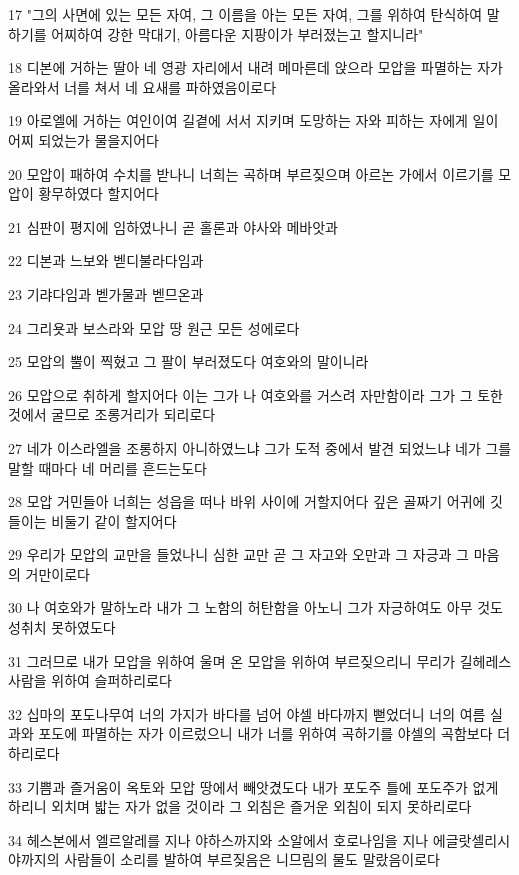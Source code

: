 \par 17 "그의 사면에 있는 모든 자여, 그 이름을 아는 모든 자여, 그를 위하여 탄식하여 말하기를 어찌하여 강한 막대기, 아름다운 지팡이가 부러졌는고 할지니라"
\par 18 디본에 거하는 딸아 네 영광 자리에서 내려 메마른데 앉으라 모압을 파멸하는 자가 올라와서 너를 쳐서 네 요새를 파하였음이로다
\par 19 아로엘에 거하는 여인이여 길곁에 서서 지키며 도망하는 자와 피하는 자에게 일이 어찌 되었는가 물을지어다
\par 20 모압이 패하여 수치를 받나니 너희는 곡하며 부르짖으며 아르논 가에서 이르기를 모압이 황무하였다 할지어다
\par 21 심판이 평지에 임하였나니 곧 홀론과 야사와 메바앗과
\par 22 디본과 느보와 벧디불라다임과
\par 23 기랴다임과 벧가물과 벧므온과
\par 24 그리욧과 보스라와 모압 땅 원근 모든 성에로다
\par 25 모압의 뿔이 찍혔고 그 팔이 부러졌도다 여호와의 말이니라
\par 26 모압으로 취하게 할지어다 이는 그가 나 여호와를 거스려 자만함이라 그가 그 토한 것에서 굴므로 조롱거리가 되리로다
\par 27 네가 이스라엘을 조롱하지 아니하였느냐 그가 도적 중에서 발견 되었느냐 네가 그를 말할 때마다 네 머리를 흔드는도다
\par 28 모압 거민들아 너희는 성읍을 떠나 바위 사이에 거할지어다 깊은 골짜기 어귀에 깃들이는 비둘기 같이 할지어다
\par 29 우리가 모압의 교만을 들었나니 심한 교만 곧 그 자고와 오만과 그 자긍과 그 마음의 거만이로다
\par 30 나 여호와가 말하노라 내가 그 노함의 허탄함을 아노니 그가 자긍하여도 아무 것도 성취치 못하였도다
\par 31 그러므로 내가 모압을 위하여 울며 온 모압을 위하여 부르짖으리니 무리가 길헤레스 사람을 위하여 슬퍼하리로다
\par 32 십마의 포도나무여 너의 가지가 바다를 넘어 야셀 바다까지 뻗었더니 너의 여름 실과와 포도에 파멸하는 자가 이르렀으니 내가 너를 위하여 곡하기를 야셀의 곡함보다 더하리로다
\par 33 기쁨과 즐거움이 옥토와 모압 땅에서 빼앗겼도다 내가 포도주 틀에 포도주가 없게 하리니 외치며 밟는 자가 없을 것이라 그 외침은 즐거운 외침이 되지 못하리로다
\par 34 헤스본에서 엘르알레를 지나 야하스까지와 소알에서 호로나임을 지나 에글랏셀리시야까지의 사람들이 소리를 발하여 부르짖음은 니므림의 물도 말랐음이로다
